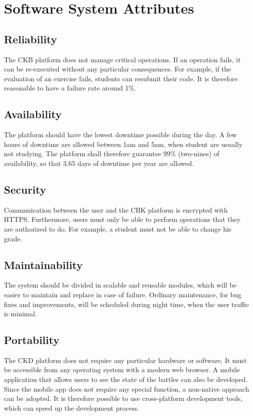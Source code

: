 \section{Software System Attributes}
\subsection{Reliability}
The CKB platform does not manage critical operations.
If an operation fails, it can be re-executed without any particular consequences.
For example, if the evaluation of an exercise fails, students can resubmit their code.
It is therefore reasonable to have a failure rate around 1\%.

\subsection{Availability}
The platform should have the lowest downtime possible during the day.
A few hours of downtime are allowed between 1am and 5am, when student are usually not studying.
The platform shall therefore guarantee 99\% (two-nines) of availability, so that 3.65 days of downtime per year are allowed.

\subsection{Security}
Communication between the user and the CBK platform is encrypted with HTTPS. %
Furthermore, users must only be able to perform operations that they are authorized to do.
For example, a student must not be able to change his grade.

\subsection{Maintainability}
The system should be divided in scalable and reusable modules,
which will be easier to maintain and replace in case of failure.
Ordinary maintenance, for bug fixes and improvements, will be scheduled during night time, when the user traffic is minimal.

\subsection{Portability}
The CKD platform does not require any particular hardware or software.
It must be accessible from any operating system with a modern web browser.
A mobile application that allows users to see the state of the battles can also be developed.
Since the mobile app does not require any special function, a non-native approach can be adopted.
It is therefore possible to use cross-platform development tools, which can speed up the development process.